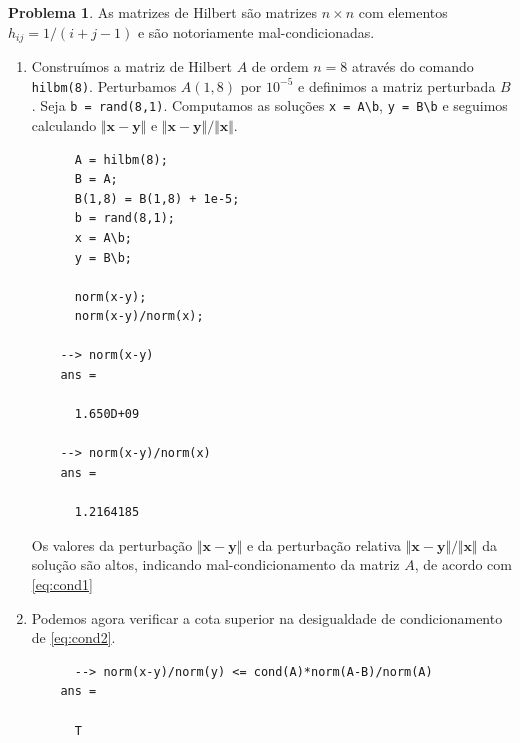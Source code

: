 \documentclass{article}
\theoremstyle{plain}
\theoremstyle{definition}
\newtheorem{prblm}[defn]{Problema}
\theoremstyle{remark}
\begin{document}
\begin{prblm}
  As matrizes de Hilbert são matrizes \(n \times n\) com elementos \(h_{ij} = 1/(i+j-1)\) e são notoriamente mal-condicionadas.

  \begin{enumerate}
  \item [(a)] Construímos a matriz de Hilbert \(A\) de ordem \(n=8\) através do comando \texttt{hilbm(8)}. Perturbamos \(A(1,8)\) por \(10^{-5}\) e definimos a matriz perturbada \(B\). Seja \texttt{b = rand(8,1)}. Computamos as soluções \texttt{x = A\textbackslash b}, \texttt{y = B\textbackslash b} e seguimos calculando \(\Vert \mathbf{x - y} \Vert\) e \(\Vert \mathbf{x - y} \Vert / \Vert \mathbf{x} \Vert\).

    \begin{verbatim}
      A = hilbm(8);
      B = A;
      B(1,8) = B(1,8) + 1e-5;
      b = rand(8,1);
      x = A\b;
      y = B\b;

      norm(x-y);
      norm(x-y)/norm(x);

    --> norm(x-y)
    ans =

      1.650D+09

    --> norm(x-y)/norm(x)
    ans =

      1.2164185
    \end{verbatim}

    Os valores da perturbação \(\Vert \mathbf{x - y} \Vert\) e da perturbação relativa \(\Vert \mathbf{x - y} \Vert / \Vert \mathbf{x}  \Vert\) da solução são altos, indicando mal-condicionamento da matriz \(A\), de acordo com \eqref{eq:cond1}

  \item [(b)] Podemos agora verificar a cota superior na desigualdade de condicionamento de \eqref{eq:cond2}.

    \begin{verbatim}
      --> norm(x-y)/norm(y) <= cond(A)*norm(A-B)/norm(A)
    ans =

      T
    \end{verbatim}

  \end{enumerate}

\end{prblm}
\end{document}
